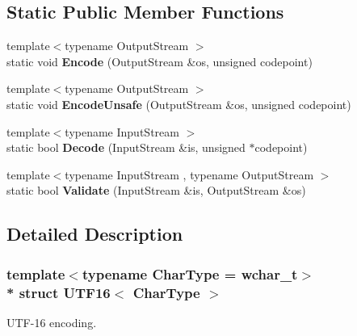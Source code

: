 \subsection*{Static Public Member Functions}
\begin{DoxyCompactItemize}
\item 
{\footnotesize template$<$typename Output\+Stream $>$ }\\static void {\bfseries Encode} (Output\+Stream \&os, unsigned codepoint)\hypertarget{a00327_a9d8ded01244e30d037c4afa10ee2b30e}{}\label{a00327_a9d8ded01244e30d037c4afa10ee2b30e}

\item 
{\footnotesize template$<$typename Output\+Stream $>$ }\\static void {\bfseries Encode\+Unsafe} (Output\+Stream \&os, unsigned codepoint)\hypertarget{a00327_aa67661e756c273871b574e7133b7fc63}{}\label{a00327_aa67661e756c273871b574e7133b7fc63}

\item 
{\footnotesize template$<$typename Input\+Stream $>$ }\\static bool {\bfseries Decode} (Input\+Stream \&is, unsigned $\ast$codepoint)\hypertarget{a00327_a124c79dfd9f9b4c3fb65bd55ba17b4be}{}\label{a00327_a124c79dfd9f9b4c3fb65bd55ba17b4be}

\item 
{\footnotesize template$<$typename Input\+Stream , typename Output\+Stream $>$ }\\static bool {\bfseries Validate} (Input\+Stream \&is, Output\+Stream \&os)\hypertarget{a00327_a7516184ed5dce10c0e7895bec124d97d}{}\label{a00327_a7516184ed5dce10c0e7895bec124d97d}

\end{DoxyCompactItemize}


\subsection{Detailed Description}
\subsubsection*{template$<$typename Char\+Type = wchar\+\_\+t$>$\\*
struct U\+T\+F16$<$ Char\+Type $>$}

U\+T\+F-\/16 encoding. 

